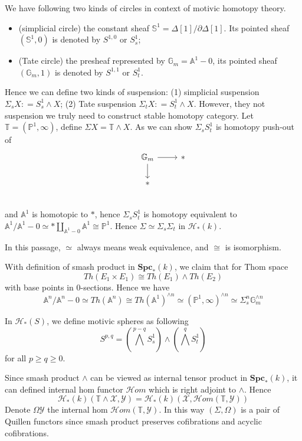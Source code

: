 \documentclass[b5paper,10pt]{article}
\begin{document}
We have following two kinds of circles in context of motivic homotopy theory.
\begin{itemize}
	\item(simplicial circle) the constant sheaf $\mathbb{S}^1= \Delta[1]/\partial \Delta[1]$. Its pointed sheaf $(\mathbb{S}^1,0)$ is denoted by $S^{1,0}$ or $S_s^1$;
	\item(Tate circle) the presheaf represented by $\mathbb{G}_m = \mathbb{A}^1-0$, its pointed sheaf $(\mathbb{G}_m,1)$ is denoted by $S^{1,1}$ or $S_t^1$.
\end{itemize}
Hence we can define two kinds of suspension: (1) simplicial suspension $\Sigma_s X \colon = S^1_s \wedge X$; (2) Tate suspension $\Sigma_t X \colon = S_t^1 \wedge X$. However, they not suspension we truly need to construct stable homotopy category. Let $\mathbb{T} = (\mathbb{P}^1,\infty)$, define $\Sigma X = \mathbb{T} \wedge X$. As we can show $\Sigma_s S^1_t$ is homotopy push-out of 
\[
\begin{tikzcd}
&\mathbb{G}_m \ar[r] \ar[d]& * \\
&* &\\
\end{tikzcd}
\]
and $\mathbb{A}^1$ is homotopic to $*$, hence $\Sigma_s S^1_t$ is homotopy equivalent to $\mathbb{A}^1/\mathbb{A}^1-0 \simeq * \coprod_{\mathbb{A}^1-0} \mathbb{A}^1 \cong \mathbb{P}^1$. Hence $\Sigma \simeq \Sigma_s \Sigma_t$ in $\mathcal{H}_*(k)$.
\begin{rmk}
	In this passage, $\simeq$ always means weak equivalence, and $\cong$ is isomorphism.
\end{rmk}
With definition of smash product in $\mathbf{Spc}_*(k)$, we claim that for Thom space
\[
Th(E_1 \times E_1) \cong Th(E_1) \wedge Th(E_2)
\]
with base points in $0$-sections.
Hence we have 
\[
\mathbb{A}^n/\mathbb{A}^n-0 \simeq Th(\mathbb{A}^n) \cong Th(\mathbb{A}^1)^{\wedge n} \simeq (\mathbb{P}^1,\infty)^{\wedge n} \simeq \Sigma_s^n \mathbb{G}_m^{\wedge n}
\]
\begin{secdefn}
	In $\mathcal{H}_*(S)$, we define motivic spheres as following
	\[
	S^{p,q}= (\bigwedge^{p-q}S^1_s) \wedge(\bigwedge^q S^1_t)
	\]
	for all $p \geq q \geq 0$.
\end{secdefn}
Since smash product $\wedge$ can be viewed as internal tensor product in $\mathbf{Spc}_*(k)$, it can defined internal hom functor $\mathcal{H}om$ which is right adjoint to $\wedge$. Hence 
\[
\mathcal{H}_*(k)(\mathbb{T} \wedge \mathcal{X}, \mathcal{Y}) = \mathcal{H}_*(k)(\mathcal{X},\mathcal{H}om(\mathbb{T},\mathcal{Y}))
\]
Denote $\Omega \mathcal{Y}$ the internal hom $\mathcal{H}om(\mathbb{T},\mathcal{Y})$. In this way $(\Sigma, \Omega)$ is a pair of Quillen functors since smash product preserves cofibrations and acyclic cofibrations. 
\end{document}
